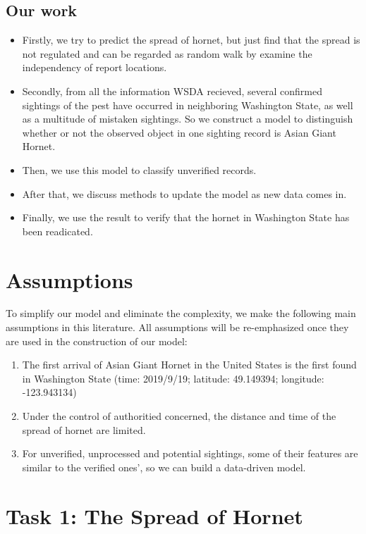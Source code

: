\documentclass[12pt]{article}
\begin{document}
\subsection{Our work}
\begin{itemize}
	\item Firstly, we try to predict the spread of hornet, but just find that the spread is not regulated and can be regarded as random walk by examine the independency of report locations.
	\item Secondly, from all the information WSDA recieved, several confirmed sightings of the pest have occurred in neighboring Washington State, as well as a multitude of mistaken sightings. So we construct a model to distinguish whether or not the observed object in one sighting record is Asian Giant Hornet.
	\item Then, we use this model to classify unverified records.
	\item After that, we discuss methods to update the model as new data comes in.
	\item Finally, we use the result to verify that the hornet in Washington State has been readicated.
\end{itemize}


\section{Assumptions}

To simplify our model and eliminate the complexity, we make the following main assumptions in this literature. All assumptions will be re-emphasized once they are used in the construction of our model:
\begin{enumerate}[\bfseries 1.]
	\item The first arrival of Asian Giant Hornet in the United States is the first found in Washington State (time: 2019/9/19; latitude: 49.149394; longitude: -123.943134)
	\item Under the control of authoritied concerned, the distance and time of the spread of hornet are limited.
	\item For unverified, unprocessed and potential sightings, some of their features are similar to the verified ones', so we can build a data-driven model.
\end{enumerate}


\section{Task 1: The Spread of Hornet}
\end{document}
